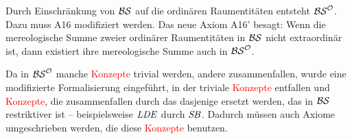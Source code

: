     Durch
    Einschränkung von $\mathcal{BS}$ auf die ordinären Raumentitäten entsteht $\mathcal{BS}^{\mathcal{O}}$.
    Dazu muss A16 modifiziert werden.
    Das neue Axiom A16' besagt: Wenn die mereologische Summe zweier ordinärer Raumentitäten in $\mathcal{BS}$ nicht extraordinär ist, dann existiert ihre mereologische Summe auch in $\mathcal{BS}^{\mathcal{O}}$.
    
    Da
    in $\mathcal{BS}^{\mathcal{O}}$ manche \textcolor{red}{Konzepte} trivial werden, andere zusammenfallen, wurde eine modifizierte Formalisierung eingeführt, in der triviale \textcolor{red}{Konzepte} entfallen und \textcolor{red}{Konzepte}, die zusammenfallen durch das dasjenige ersetzt werden, das in $\mathcal{BS}$ restriktiver ist -- beispielsweise $\mathit{LDE}$ durch $\mathit{S\hspace*{-0.25ex}B}$. 
    Dadurch müssen auch Axiome umgeschrieben werden, die diese \textcolor{red}{Konzepte} benutzen.
    
